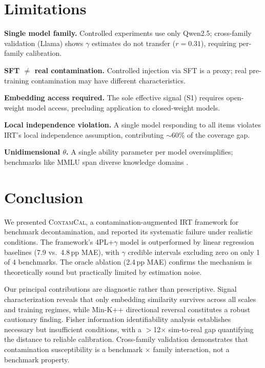\documentclass[11pt,a4paper]{article}
\begin{document}
\section{Limitations}

\textbf{Single model family.} Controlled experiments use only Qwen2.5; cross-family validation (Llama) shows $\gamma$ estimates do not transfer ($r = 0.31$), requiring per-family calibration.

\textbf{SFT $\neq$ real contamination.} Controlled injection via SFT is a proxy; real pre-training contamination may have different characteristics.

\textbf{Embedding access required.} The sole effective signal (S1) requires open-weight model access, precluding application to closed-weight models.

\textbf{Local independence violation.} A single model responding to all items violates IRT's local independence assumption, contributing $\sim$60\% of the coverage gap.

\textbf{Unidimensional $\theta$.} A single ability parameter per model oversimplifies; benchmarks like MMLU span diverse knowledge domains \citep{reckase2009multidimensional, burnell2023revealing}.

\section{Conclusion}

We presented \textsc{ContamCal}, a contamination-augmented IRT framework for benchmark decontamination, and reported its systematic failure under realistic conditions.
The framework's 4PL+$\gamma$ model is outperformed by linear regression baselines (7.9 vs.\ 4.8\,pp MAE), with $\gamma$ credible intervals excluding zero on only 1 of 4 benchmarks.
The oracle ablation (2.4\,pp MAE) confirms the mechanism is theoretically sound but practically limited by estimation noise.

Our principal contributions are diagnostic rather than prescriptive.
Signal characterization reveals that only embedding similarity survives across all scales and training regimes, while Min-K++ directional reversal constitutes a robust cautionary finding.
Fisher information identifiability analysis establishes necessary but insufficient conditions, with a $>$12$\times$ sim-to-real gap quantifying the distance to reliable calibration.
Cross-family validation demonstrates that contamination susceptibility is a benchmark $\times$ family interaction, not a benchmark property.
\end{document}
